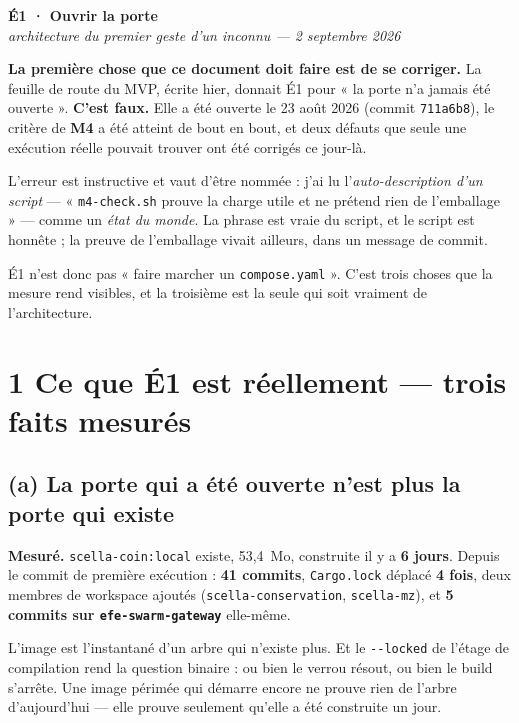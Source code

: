 \documentclass[11pt]{article}
\newcommand{\code}[1]{\texttt{\small #1}}
\newcommand{\mm}[1]{\textbf{#1}}
\newcommand{\mesure}[1]{{\color{efeteal}\textbf{Mesuré.} }#1\par}
\begin{document}
\begin{center}
{\Huge\bfseries\color{efenavy} \mbox{É1} · Ouvrir la porte}\\[3pt]
{\large\color{efegray}\itshape architecture du premier geste d'un inconnu --- 2 septembre 2026}
\end{center}

\vspace{2pt}

\begin{these}
\textbf{La première chose que ce document doit faire est de se corriger.} La feuille de route du MVP,
écrite hier, donnait \mbox{É1} pour « la porte n'a jamais été ouverte ». \textbf{C'est faux.} Elle a
été ouverte le 23 août 2026 (commit \code{711a6b8}), le critère de \mm{M4} a été atteint de bout en
bout, et deux défauts que seule une exécution réelle pouvait trouver ont été corrigés ce jour-là.

L'erreur est instructive et vaut d'être nommée : j'ai lu l'\emph{auto-description d'un script} ---
« \code{m4-check.sh} prouve la charge utile et ne prétend rien de l'emballage » --- comme un
\emph{état du monde}. La phrase est vraie du script, et le script est honnête ; la preuve de
l'emballage vivait ailleurs, dans un message de commit.

\mbox{É1} n'est donc pas « faire marcher un \code{compose.yaml} ». C'est trois choses que la mesure
rend visibles, et la troisième est la seule qui soit vraiment de l'architecture.
\end{these}

\section{1 \;\textbar\; Ce que \mbox{É1} est réellement --- trois faits mesurés}

\subsection{(a) La porte qui a été ouverte n'est plus la porte qui existe}
\mesure{\code{scella-coin:local} existe, 53,4~Mo, construite il y a \textbf{6 jours}. Depuis le
commit de première exécution : \textbf{41 commits}, \code{Cargo.lock} déplacé \textbf{4 fois}, deux
membres de workspace ajoutés (\code{scella-conservation}, \code{scella-mz}), et \textbf{5 commits sur
\code{efe-swarm-gateway}} elle-même.}

L'image est l'instantané d'un arbre qui n'existe plus. Et le \code{-{}-locked} de l'étage de
compilation rend la question binaire : ou bien le verrou résout, ou bien le build s'arrête. Une
image périmée qui démarre encore ne prouve rien de l'arbre d'aujourd'hui --- elle prouve seulement
qu'elle a été construite un jour.
\end{document}
